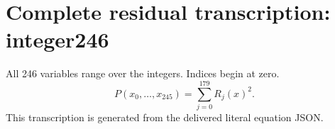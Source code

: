 \documentclass[10pt]{article}
\begin{document}
\section*{Complete residual transcription: integer246}
All 246 variables range over the integers. Indices begin at zero.
\[P(x_0,\ldots,x_{245})=\sum_{j=0}^{179}R_j(x)^2.\]
This transcription is generated from the delivered literal equation JSON.

\end{document}
